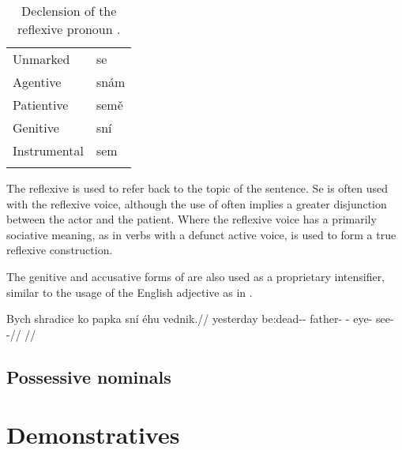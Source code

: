 \begin{table}
    \footnotesize\sffamily
    \caption{Declension of the reflexive pronoun .}\label{tab:se-declension}
    \medskip
    \begin{tabu} to 0.5 
        \toprule \addlinespace
        Unmarked        & se    \\ \addlinespace
        Agentive        & snám  \\ \addlinespace
        Patientive      & semě  \\ \addlinespace
        Genitive        & sní   \\ \addlinespace
        Instrumental    & sem   \\ \addlinespace
        \bottomrule
    \end{tabu}
\end{table}

The reflexive  is used to refer back to the topic of the sentence. Se is
often used with the reflexive voice, although the use of  often implies
a greater disjunction between the actor and the patient. Where the reflexive
voice has a primarily sociative meaning, as in verbs with a defunct active
voice,  is used to form a true reflexive construction.

\pex    \a {}
        \a {}
\xe

\pex
        \a {}
        \a {} 
\xe

The genitive and accusative forms of  are also used as a proprietary
intensifier, similar to the usage of the English adjective  as in
.

\pex
\begingl
\gla Bych shradice ko papka sní éhu vednik.//
\glb yesterday be:dead-\Pf{}-\Quot{} \Att{} father-\Dim{} \Refl{}-\Gen{} eye-\Ins{} see-\Pv{}-\Pf{}//
\glft {}//
\endgl
\xe

\subsection{Possessive nominals}\label{sec:possessive-nominals}

\section{Demonstratives}\label{sec:demonstratives}

